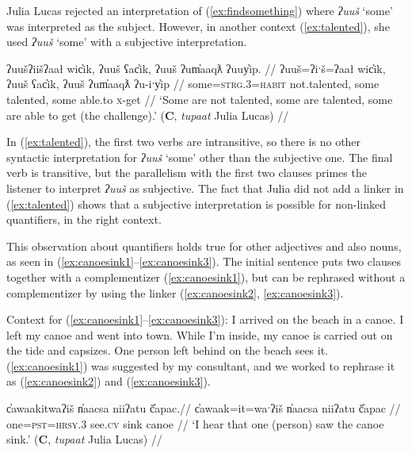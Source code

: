 Julia Lucas rejected an interpretation of (\ref{ex:findsomething}) where \textit{ʔuuš} `some' was interpreted as the subject. However, in another context (\ref{ex:talented}), she used \textit{ʔuuš} `some' with a subjective interpretation.

\ex \label{ex:talented}
\begingl
\glpreamble ʔuušʔiišʔaał wic̓ik, ʔuuš ʕac̓ik, ʔuuš ʔum̓aaqƛ ʔuuy̓ip. //
\gla ʔuuš=ʔiˑš=ʔaał wic̓ik, ʔuuš ʕac̓ik, ʔuuš ʔum̓aaqƛ ʔu-iˑy̓ip //
\glb some=\textsc{strg.3}=\textsc{habit} not.talented, some talented, some able.to \textsc{x}-get //
\glft ‘Some are not talented, some are talented, some are able to get (the challenge).’ (\textbf{C}, \textit{tupaat} Julia Lucas) //
\endgl
\xe

In (\ref{ex:talented}), the first two verbs are intransitive, so there is no other syntactic interpretation for \textit{ʔuuš} `some' other than the subjective one. The final verb is transitive, but the parallelism with the first two clauses primes the listener to interpret \textit{ʔuuš} as subjective. The fact that Julia did not add a linker in (\ref{ex:talented}) shows that a subjective interpretation is possible for non-linked quantifiers, in the right context. %

This observation about quantifiers holds true for other adjectives and also nouns, as seen in (\ref{ex:canoesink1}--\ref{ex:canoesink3}). The initial sentence puts two clauses together with a complementizer (\ref{ex:canoesink1}), but can be rephrased without a complementizer by using the linker (\ref{ex:canoesink2}, \ref{ex:canoesink3}).

\vspace{5pt}

\noindent Context for (\ref{ex:canoesink1}--\ref{ex:canoesink3}): I arrived on the beach in a canoe. I left my canoe and went into town. While I'm inside, my canoe is carried out on the tide and capsizes. One person left behind on the beach sees it. (\ref{ex:canoesink1}) was suggested by my consultant, and we worked to rephrase it as (\ref{ex:canoesink2}) and (\ref{ex:canoesink3}).

\ex \label{ex:canoesink1}
\begingl
\glpreamble c̓awaakitwaʔiš n̓aacsa niiʔatu č̓apac.//
\gla c̓awaak=it=waˑʔiš n̓aacsa niiʔatu č̓apac //
\glb one=\textsc{pst}=\textsc{hrsy.3} see.\textsc{cv} sink canoe //
\glft `I hear that one (person) saw the canoe sink.' (\textbf{C}, \textit{tupaat} Julia Lucas) //
\endgl
\xe

